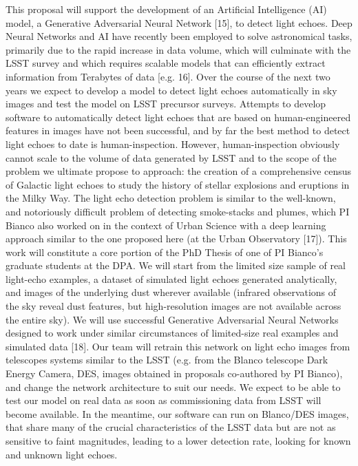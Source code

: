 \documentclass{proposalnsf}
\begin{document}
This proposal will support the development of an Artificial Intelligence (AI) model, a Generative Adversarial Neural Network [15], to detect light echoes.  Deep Neural Networks and AI have recently been employed to solve astronomical tasks, primarily due to the rapid increase in data volume, which will culminate with the LSST survey and which requires scalable models that can efficiently extract information from Terabytes of data [e.g. 16].  Over the course of the next two years we expect to develop a model to detect light echoes automatically in sky images and test the model on LSST precursor surveys.  Attempts to develop software to automatically detect light echoes that are based on human-engineered features in images have not been successful, and by far the best method to detect light echoes to date is human-inspection. However, human-inspection obviously cannot scale to the volume of data generated by LSST and to the scope of the problem we ultimate propose to approach: the creation of a comprehensive census of Galactic light echoes to study the history of stellar explosions and eruptions in the Milky Way.  
The light echo detection problem is similar to the well-known, and notoriously difficult problem of detecting smoke-stacks and plumes, which PI Bianco also worked on in the context of Urban Science with a deep learning approach similar to the one proposed here (at the Urban Observatory [17]).  This work will constitute a core portion of the PhD Thesis of one of PI Bianco’s graduate students at the DPA.  We will start from the limited size sample of real light-echo examples, a dataset of simulated light echoes generated analytically, and images of the underlying dust wherever available (infrared observations of the sky reveal dust features, but high-resolution images are not available across the entire sky).  We will use successful Generative Adversarial Neural Networks designed to work under similar circumstances of limited-size real examples and simulated data [18].  Our team will retrain this network on light echo images from telescopes systems similar to the LSST (e.g. from the Blanco telescope Dark Energy Camera, DES, images obtained in proposals co-authored by PI Bianco), and change the network architecture to suit our needs. We expect to be able to test our model on real data as soon as commissioning data from LSST will become available.  In the meantime, our software can run on Blanco/DES images, that share many of the crucial characteristics of the LSST data but are not as sensitive to faint magnitudes, leading to a lower detection rate, looking for known and unknown light echoes. 
\end{document}
